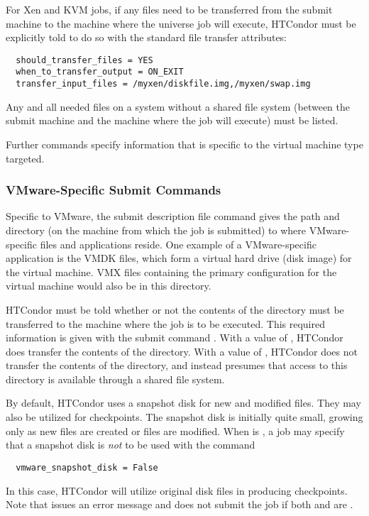 For Xen and KVM jobs, if any files need to be transferred from the submit machine
to the machine where the  universe job will execute, 
HTCondor must be explicitly told to do so with the 
standard file transfer attributes:
\footnotesize
\begin{verbatim}
  should_transfer_files = YES
  when_to_transfer_output = ON_EXIT
  transfer_input_files = /myxen/diskfile.img,/myxen/swap.img
\end{verbatim}
\normalsize
Any and all needed files on a system without a shared file
system (between the submit machine and the machine where the
job will execute) must be listed.

Further commands specify information that is specific to the
virtual machine type targeted.

\subsubsection{\label{sec:vm-VMwaresubmitfile}VMware-Specific Submit Commands}

Specific to VMware, the submit description file command
 gives the path and directory
(on the machine from which the job is submitted)
to where VMware-specific files and applications reside.
One example of a VMware-specific application is the VMDK files,
which form a virtual hard drive (disk image) for the virtual machine.
VMX files containing the primary configuration for the virtual
machine would also be in this directory.

HTCondor must be told whether or not the contents of the 
directory must be transferred to the machine where the job is
to be executed.
This required information is given with the submit command
.
With a value of ,
HTCondor does transfer the contents of the directory.
With a value of ,
HTCondor does not transfer the contents of the directory,
and instead presumes that access to this directory is
available through a shared file system.

By default, HTCondor uses a snapshot disk for new and modified files.
They may also be utilized for checkpoints.
The snapshot disk is initially quite small,
growing only as new files are created or files are modified.
When  is ,
a job may specify that a snapshot disk is \emph{not} to be
used with the command
\begin{verbatim}
  vmware_snapshot_disk = False
\end{verbatim}
In this case, HTCondor will utilize original disk files in producing
checkpoints. 
Note that  issues an error message and does not
submit the job if both 
and  are .

